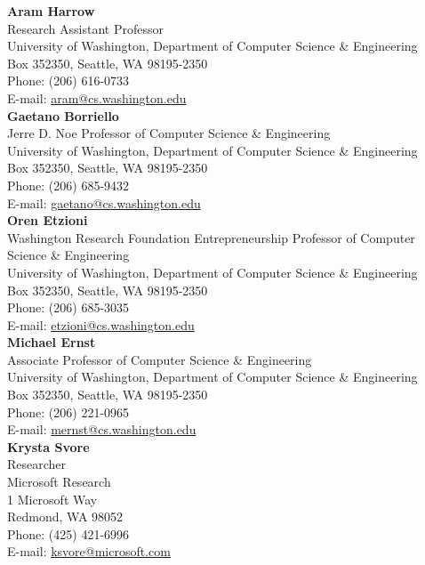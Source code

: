 \documentclass[letter]{article}
\begin{document}
\pagebreak

{\bf Aram Harrow}
\\
Research Assistant Professor\\
University of Washington, Department of Computer Science \& Engineering\\
Box 352350, Seattle, WA 98195-2350\\
Phone: (206) 616-0733\\
E-mail: \url{aram@cs.washington.edu}\\

{\bf Gaetano Borriello}\\
Jerre D. Noe Professor of Computer Science \& Engineering\\
University of Washington, Department of Computer Science \& Engineering\\
Box 352350, Seattle, WA 98195-2350\\
Phone: (206) 685-9432\\
E-mail: \url{gaetano@cs.washington.edu}\\

{\bf Oren Etzioni}\\
Washington Research Foundation Entrepreneurship Professor of Computer Science \& Engineering\\
University of Washington, Department of Computer Science \& Engineering\\
Box 352350, Seattle, WA 98195-2350\\
Phone: (206) 685-3035\\
E-mail: \url{etzioni@cs.washington.edu}\\

{\bf Michael Ernst}\\
Associate Professor of Computer Science \& Engineering\\
University of Washington, Department of Computer Science \& Engineering\\
Box 352350, Seattle, WA 98195-2350\\
Phone: (206) 221-0965\\
E-mail: \url{mernst@cs.washington.edu}\\

{\bf Krysta Svore}\\
Researcher\\
Microsoft Research\\
1 Microsoft Way\\
Redmond, WA 98052\\
Phone: (425) 421-6996\\
E-mail: \url{ksvore@microsoft.com}\\
\end{document}
